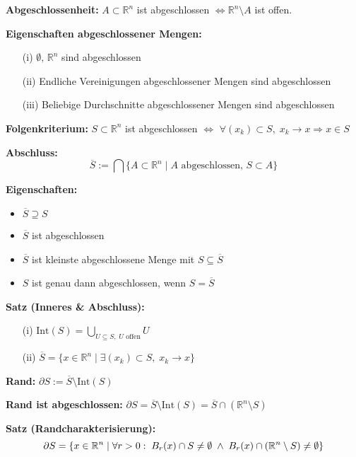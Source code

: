 \begin{itemize}
\textbf{Abgeschlossenheit:}  
\(A \subset \mathbb{R}^n\) ist abgeschlossen \(\Leftrightarrow \mathbb{R}^n \setminus A\) ist offen.

\textbf{Eigenschaften abgeschlossener Mengen:}
\begin{itemize}
  \item[(i)] \(\emptyset,\, \mathbb{R}^n\) sind abgeschlossen
  \item[(ii)] Endliche Vereinigungen abgeschlossener Mengen sind abgeschlossen
  \item[(iii)] Beliebige Durchschnitte abgeschlossener Mengen sind abgeschlossen
\end{itemize}

\textbf{Folgenkriterium:}  
\(S \subset \mathbb{R}^n\) ist abgeschlossen \(\Leftrightarrow\)  
\(\forall (x_k) \subset S,\; x_k \to x \Rightarrow x \in S\)

\textbf{Abschluss:}  
\[
\overline{S} := \bigcap \{A \subset \mathbb{R}^n \mid A \text{ abgeschlossen, } S \subset A\}
\]

\textbf{Eigenschaften:}
\begin{itemize}
  \item \(\overline{S} \supseteq S\)
  \item \(\overline{S}\) ist abgeschlossen
  \item \(\overline{S}\) ist kleinste abgeschlossene Menge mit \(S \subseteq \overline{S}\)
  \item \(S\) ist genau dann abgeschlossen, wenn \(S = \overline{S}\)
\end{itemize}

\textbf{Satz (Inneres \& Abschluss):}
\begin{itemize}
  \item[(i)] \(\displaystyle \text{Int}(S) = \bigcup_{U \subseteq S,\; U \text{ offen}} U\)
  \item[(ii)] \(\displaystyle \overline{S} = \{x \in \mathbb{R}^n \mid \exists (x_k) \subset S,\; x_k \to x\}\)
\end{itemize}

\textbf{Rand:}  
\(\partial S := \overline{S} \setminus \text{Int}(S)\)

\textbf{Rand ist abgeschlossen:}  
\(\partial S = \overline{S} \setminus \text{Int}(S) = \overline{S} \cap (\mathbb{R}^n \setminus S)\)

\textbf{Satz (Randcharakterisierung):}  
\[
\partial S = \{x \in \mathbb{R}^n \mid \forall r > 0: \\
\; B_r(x) \cap S \ne \emptyset \;\land\; B_r(x) \cap (\mathbb{R}^n \setminus S) \ne \emptyset \}
\]



\end{itemize}
